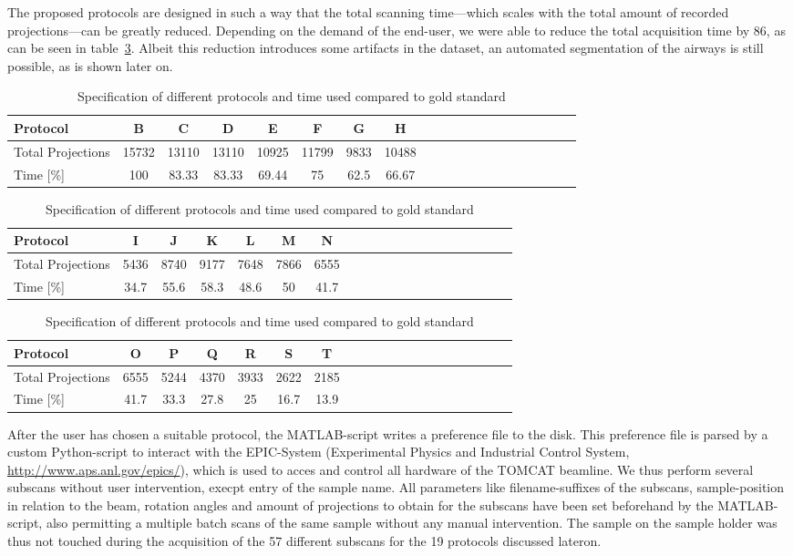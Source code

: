 The proposed protocols are designed in such a way that the total scanning time---which scales with the total amount of recorded projections---can be greatly reduced. Depending on the demand of the end-user, we were able to reduce the total acquisition time by 86\percent, as can be seen in table~\ref{tab:projections}. Albeit this reduction introduces some artifacts in the dataset, an automated segmentation of the airways is still possible, as is shown later on.

\begin{table}
\centering
	\caption{Specification of different protocols and time used compared to gold standard}
	\begin{tabular*}{\textwidth}{l@{\extracolsep\fill}ccccccccccccccccccc}
		\toprule
		Protocol 			& B & C & D & E & F & G & H\\
		\midrule
		Total Projections 	& 15732 & 13110 & 13110 & 10925 & 11799 & 9833 & 10488\\
		Time [\%] 			& 100 & 83.33 & 83.33 & 69.44 & 75 & 62.5 & 66.67\\
		\bottomrule
	\end{tabular*}
	\begin{tabular*}{\textwidth}{l@{\extracolsep\fill}ccccccccccccccccccc}
		\toprule
		Protocol 			& I & J & K & L & M & N \\
		\midrule
		Total Projections 	& 5436 & 8740 & 9177 & 7648 & 7866 & 6555 \\
		Time [\%] 			& 34.7 & 55.6 & 58.3 & 48.6 & 50 & 41.7 \\
 		\bottomrule
	\end{tabular*}
	\begin{tabular*}{\textwidth}{l@{\extracolsep\fill}ccccccccccccccccccc}
		\toprule
		Protocol 			& O & P & Q & R & S & T \\
		\midrule
		Total Projections 	& 6555 & 5244 & 4370 & 3933 & 2622 & 2185 \\
		Time [\%] 			& 41.7 & 33.3 & 27.8 & 25 & 16.7 & 13.9 \\
		\bottomrule
	\end{tabular*}
	\label{tab:projections}
\end{table}

After the user has chosen a suitable protocol, the MATLAB-script writes a preference file to the disk. This preference file is parsed by a custom Python-script to interact with the EPIC-System (Experimental Physics and Industrial Control System, \url{http://www.aps.anl.gov/epics/}), which is used to acces and control all hardware of the TOMCAT beamline. We thus perform several subscans without user intervention, execpt entry of the sample name. All parameters like filename-suffixes of the subscans, sample-position in relation to the beam, rotation angles and amount of projections to obtain for the subscans have been set beforehand by the MATLAB-script, also permitting a multiple batch scans of the same sample without any manual intervention. The sample on the sample holder was thus not touched during the acquisition of the 57 different subscans for the 19 protocols discussed lateron. 

